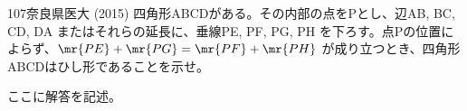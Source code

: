 \begin{prob}{107}{}{奈良県医大 (2015)}
 四角形ABCDがある。その内部の点をPとし、辺AB, BC, CD, DA またはそれらの延長に、垂線PE, PF, PG, PH を下ろす。点Pの位置によらず、$\mr{PE}+\mr{PG}=\mr{PF}+\mr{PH}$ が成り立つとき、四角形ABCDはひし形であることを示せ。
\end{prob}
ここに解答を記述。